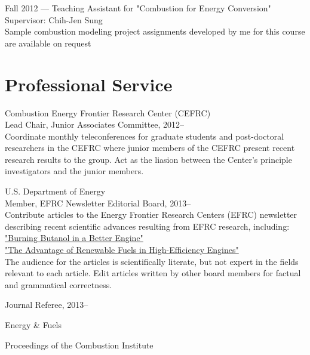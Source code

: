 Fall 2012 --- Teaching Assistant for "Combustion for Energy Conversion"\\
Supervisor: Chih-Jen Sung\\
Sample combustion modeling project assignments developed by me for this
course are available on request

\section{{\sectionfont Professional Service}}

Combustion Energy Frontier Research Center (CEFRC)\\
Lead Chair, Junior Associates Committee, 2012--\\
Coordinate monthly teleconferences for graduate students
and post-doctoral researchers in the CEFRC where junior members of
the CEFRC present recent research results to the group.
Act as the liasion between the Center's principle investigators
and the junior members.

\vspace{\baselineskip}

U.S. Department of Energy\\
Member, EFRC Newsletter Editorial Board, 2013--\\
Contribute articles to the Energy Frontier Research Centers (EFRC)
newsletter describing recent scientific advances resulting from 
EFRC research, including:\\
\href{http://www.energyfrontier.us/newsletter/201210/burning-butanol-better-engine}
{"Burning Butanol in a Better Engine"}\\
\href{http://www.energyfrontier.us/newsletter/201401/advantage-renewable-fuels-high-efficiency-engines}
{"The Advantage of Renewable Fuels in High-Efficiency Engines"}\\
The audience for the articles is scientifically literate, but not
expert in the fields relevant to each article. Edit articles written 
by other board members for factual and grammatical correctness.

\vspace{\baselineskip}

Journal Referee, 2013--
   \begin{innerlist}
       \item[] Energy \& Fuels
       \item[] Proceedings of the Combustion Institute
   \end{innerlist}

\vspace{0.5em}

